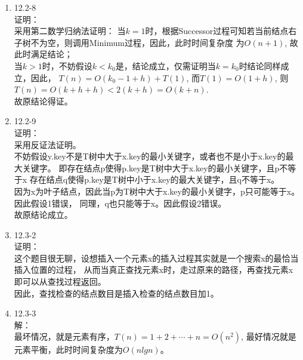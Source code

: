\documentclass[UTF8]{ctexart}
\begin{document}
\begin{enumerate}
	\item 12.2-8 \\
	证明：\\
		采用第二数学归纳法证明：
		当$k=1$时，根据Successor过程可知若当前结点右子树不为空，则调用Minimum过程，因此，此时时间复杂度
		为$O(n+1)$, 故此时满足结论；\\
		当$k>1$时，不妨假设$k<k_0$是，结论成立，仅需证明当$k=k_0$时结论同样成立，因此，
		$T(n) = O(k_0-1+h) + T(1)$, 而$T(1) = O(1+h)$, 则$T(n) = O(k+h+h) < 2(k+h) = O(k+n)$.	\\
		故原结论得证。
	
	\item 12.2-9 \\
	证明：\\
		采用反证法证明。\\
		不妨假设y.key不是T树中大于x.key的最小关键字，或者也不是小于x.key的最大关键字。
		即存在结点p使得p.key是T树中大于x.key的最小关键字，且p不等于x
		  存在结点q使得p.key是T树中小于x.key的最大关键字，且q不等于x。\\
		因为x为叶子结点，因此当p为T树中大于x.key的最小关键字，p只可能等于x。因此假设1错误，
		同理，q也只能等于x。因此假设2错误。\\
		故原结论成立。
		
	\item 12.3-2 \\
	证明：\\
		这个题目很无聊，设想插入一个元素x的插入过程其实就是一个搜索x的最恰当插入位置的过程，
		从而当真正查找元素x时，走过原来的路径，再查找元素x即可以从查找过程返回。\\
		因此，查找检查的结点数目是插入检查的结点数目加1。
	
	\item 12.3-3 \\
	解：\\
		最坏情况，就是元素有序，$T(n) = 1+2+\cdots+n = O(n^2)$,
		最好情况就是元素平衡，此时时间复杂度为$O(nlgn)$。
		

\end{enumerate}
\end{document}
